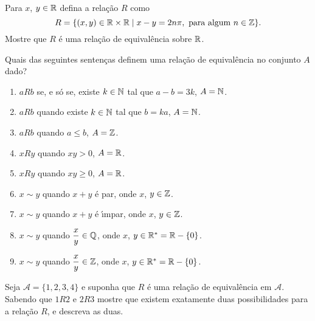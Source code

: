 \documentclass[12pt]{exam}
\begin{document}
    \vspace{.3cm}

    \questao{} Para $x$, $y \in \mathbb{R}$ defina a relação $R$ como
    \[
        R = \{(x,y) \in \mathbb{R} \times \mathbb{R} \mid x - y = 2n\pi, \mbox{ para algum } n \in \mathbb{Z}\}.
    \]
    Mostre que $R$ é uma relação de equivalência sobre $\mathbb{R}$.

    \vspace{.3cm}

    \questao{} Quais das seguintes senten{\c c}as definem uma rela{\c c}{\~a}o de equival{\^e}ncia no conjunto $A$ dado?
    \begin{enumerate}[label={\alph*})]
        \item $aRb$ se, e s{\'o} se, existe $k \in \mathbb{N}$ tal que $a - b = 3k$, $A = \mathbb{N}$.

        \item $aRb$ quando existe $k \in \mathbb{N}$ tal que $b = k a$, $A = \mathbb{N}$.

        \item $aRb$ quando $a \le b$, $A = \mathbb{Z}$.

        \item $xRy$ quando $xy > 0$, $ A = \mathbb{R}$.

        \item $xRy$ quando $xy \ge 0$, $ A = \mathbb{R}$.

        \item $x \sim y$ quando $x + y$ \'e par, onde $x$, $y \in \mathbb{Z}$.

        \item $x \sim y$ quando $x + y$ \'e {\'\i}mpar, onde $x$, $y \in \mathbb{Z}$.

        \item $x \sim y$ quando $\dfrac{x}{y} \in \mathbb{Q}$, onde $x$, $y \in \mathbb{R}^* = \mathbb{R} - \{0\}$.

        \item $x \sim y$ quando $\dfrac{x}{y} \in \mathbb{Z}$, onde $x$, $y \in \mathbb{R}^* = \mathbb{R} - \{0\}$.
    \end{enumerate}

    \vspace{.3cm}

    \questao{} Seja $\mathcal{A} = \{1,2,3,4\}$ e suponha que $R$ \'e uma rela\c{c}\~ao de equival\^encia em $\mathcal{A}$. Sabendo que $1R2$ e $2R3$ mostre que existem exatamente duas possibilidades para a rela\c{c}\~ao $R$, e descreva as duas.

    \vspace{.3cm}
\end{document}
